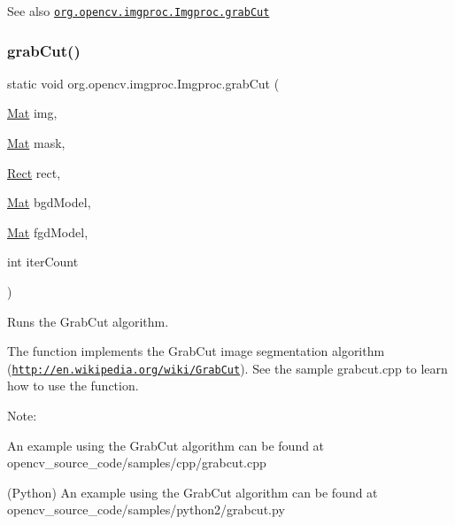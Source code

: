 \begin{DoxySeeAlso}{See also}
\href{http://docs.opencv.org/modules/imgproc/doc/miscellaneous_transformations.html#grabcut}{\tt org.\+opencv.\+imgproc.\+Imgproc.\+grab\+Cut} 
\end{DoxySeeAlso}
\mbox{\label{classorg_1_1opencv_1_1imgproc_1_1_imgproc_a8be3ea0718f04a8b17bed9d0a46ba7cc}} 
\subsubsection{\texorpdfstring{grab\+Cut()}{grabCut()}\hspace{0.1cm}{\footnotesize\ttfamily [2/2]}}
{\footnotesize\ttfamily static void org.\+opencv.\+imgproc.\+Imgproc.\+grab\+Cut (\begin{DoxyParamCaption}\item[{\mbox{\hyperlink{classorg_1_1opencv_1_1core_1_1_mat}{Mat}}}]{img,  }\item[{\mbox{\hyperlink{classorg_1_1opencv_1_1core_1_1_mat}{Mat}}}]{mask,  }\item[{\mbox{\hyperlink{classorg_1_1opencv_1_1core_1_1_rect}{Rect}}}]{rect,  }\item[{\mbox{\hyperlink{classorg_1_1opencv_1_1core_1_1_mat}{Mat}}}]{bgd\+Model,  }\item[{\mbox{\hyperlink{classorg_1_1opencv_1_1core_1_1_mat}{Mat}}}]{fgd\+Model,  }\item[{int}]{iter\+Count }\end{DoxyParamCaption})\hspace{0.3cm}{\ttfamily [static]}}

Runs the Grab\+Cut algorithm.

The function implements the Grab\+Cut image segmentation algorithm (\href{http://en.wikipedia.org/wiki/GrabCut}{\tt http\+://en.\+wikipedia.\+org/wiki/\+Grab\+Cut}). See the sample {\ttfamily grabcut.\+cpp} to learn how to use the function.

Note\+:


\begin{DoxyItemize}
\item An example using the Grab\+Cut algorithm can be found at opencv\+\_\+source\+\_\+code/samples/cpp/grabcut.\+cpp 
\item (Python) An example using the Grab\+Cut algorithm can be found at opencv\+\_\+source\+\_\+code/samples/python2/grabcut.\+py 
\end{DoxyItemize}


